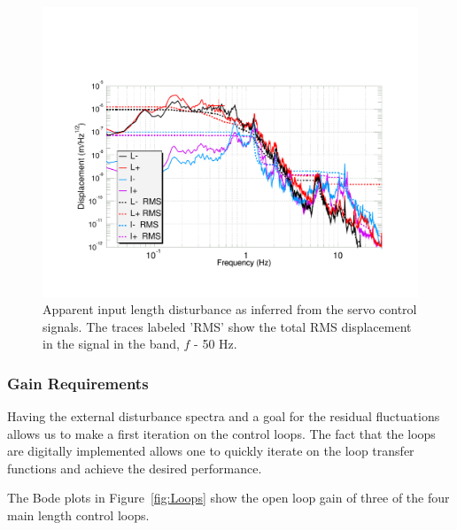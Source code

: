 \begin{figure}[!h] 
\centerline{\includegraphics[angle=0,width=6.5in]{Figures/Chap5/disturbances.pdf}}
\caption[Length Disturbances]{Apparent input length disturbance as inferred
         from the servo control signals. The traces labeled 'RMS' show the total
         RMS displacement in the signal in the band,  $f$ - 50 Hz.}
\label{fig:dist}
\end{figure}


\subsubsection{Gain Requirements}

Having the external disturbance spectra and a goal for the residual 
fluctuations allows us to make a first iteration on the control loops. The
fact that the loops are digitally implemented allows one to quickly iterate
on the loop transfer functions and achieve the desired performance.

The Bode plots in Figure~\ref{fig:Loops} show the open loop gain of 
three of the four main length control loops.

